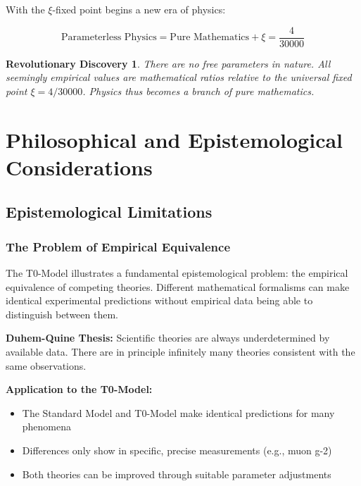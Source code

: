 \documentclass[12pt,a4paper]{report}
\newtheorem{discovery}{Revolutionary Discovery}[chapter]
\begin{document}
	With the $\xi$-fixed point begins a new era of physics:
	
	\begin{equation}
		\boxed{\text{Parameterless Physics} = \text{Pure Mathematics} + \xi = \frac{4}{30000}}
	\end{equation}
	
	\begin{discovery}
		There are no free parameters in nature. All seemingly empirical values are mathematical ratios relative to the universal fixed point $\xi = 4/30000$. Physics thus becomes a branch of pure mathematics.
	\end{discovery}
	\chapter{Philosophical and Epistemological Considerations}\label{chap:philosophy}
	
	\section{Epistemological Limitations}\label{sec:epistemological_limitations}
	
	\subsection{The Problem of Empirical Equivalence}\label{subsec:empirical_equivalence}
	
	The T0-Model illustrates a fundamental epistemological problem: the empirical equivalence of competing theories. Different mathematical formalisms can make identical experimental predictions without empirical data being able to distinguish between them.
	
	\textbf{Duhem-Quine Thesis:}
	Scientific theories are always underdetermined by available data. There are in principle infinitely many theories consistent with the same observations.
	
	\textbf{Application to the T0-Model:}
	\begin{itemize}
		\item The Standard Model and T0-Model make identical predictions for many phenomena
		\item Differences only show in specific, precise measurements (e.g., muon g-2)
		\item Both theories can be improved through suitable parameter adjustments
	\end{itemize}
	
\end{document}
